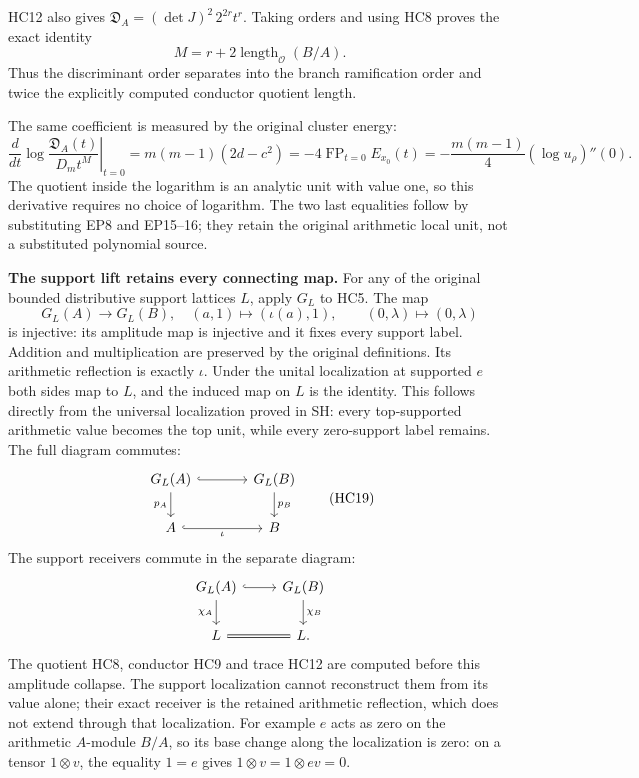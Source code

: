 HC12 also gives
$\mathfrak D_A=(\det J)^2\,2^{2r}t^r$.
Taking orders and using HC8 proves the exact identity
\[
 M=r+2\operatorname{length}_{\mathcal O}(B/A).
 \tag{HC16}
\]
Thus the discriminant order separates into the branch ramification
order and twice the explicitly computed conductor quotient length.

The same coefficient is measured by the original cluster energy:
\[
 \left.\frac{d}{dt}\log
       \frac{\mathfrak D_A(t)}{D_m t^M}\right|_{t=0}
   =m(m-1)(2d-c^2)
   =-4\operatorname{FP}_{t=0}E_{x_0}(t)
   =-\frac{m(m-1)}4(\log u_\rho)''(0).
 \tag{HC17}
\]
The quotient inside the logarithm is an analytic unit with value
one, so this derivative requires no choice of logarithm.
The two last equalities follow by substituting EP8 and EP15--16;
they retain the original arithmetic local unit, not a substituted
polynomial source.

\HC\textbf{The support lift retains every connecting map.}
For any of the original bounded distributive support lattices $L$,
apply $G_L$ to HC5. The map
\[
 G_L(A)\longrightarrow G_L(B),\quad
 (a,1)\longmapsto(\iota(a),1),\qquad
 (0,\lambda)\longmapsto(0,\lambda)
 \tag{HC18}
\]
is injective: its amplitude map is injective and it fixes every
support label. Addition and multiplication are preserved by the
original definitions. Its arithmetic reflection is exactly $\iota$.
Under the unital localization at supported $e$ both sides map to
$L$, and the induced map on $L$ is the identity. This follows
directly from the universal localization proved in SH: every
top-supported arithmetic value becomes the top unit, while every
zero-support label remains. The full diagram commutes:
\[
 \begin{tikzcd}[column sep=large]
 G_L(A)\arrow[r,hook]\arrow[d,"p_A"']
  &G_L(B)\arrow[d,"p_B"]\\
 A\arrow[r,hook,"\iota"']&B
 \end{tikzcd}
 \tag{HC19}
\]
The support receivers commute in the separate diagram:
\[
 \begin{tikzcd}
 G_L(A)\arrow[r,hook]\arrow[d,"\chi_A"']&
 G_L(B)\arrow[d,"\chi_B"]\\
 L\arrow[r,equal]&L.
 \end{tikzcd}
\]
The quotient HC8, conductor HC9 and trace HC12 are computed before
this amplitude collapse. The support localization cannot reconstruct
them from its value alone; their exact receiver is the retained
arithmetic reflection, which does not extend through that localization.
For example $e$ acts as zero on the arithmetic $A$-module $B/A$,
so its base change along the localization is zero: on a tensor
$1\otimes v$, the equality $1=e$ gives
$1\otimes v=1\otimes ev=0$.

